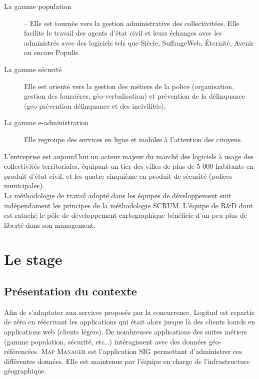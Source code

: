 \documentclass{rapportUHA40}
\begin{document}
\begin{description}
  \item[La gamme population] – Elle est tournée vers la gestion administrative des
    collectivitées. Elle facilite le travail des agents d'état civil et leurs
    échanges avec les administrés avec des logiciels tels que Siècle, SuffrageWeb,
    Éternité, Avenir ou encore Populis.
  \item[La gamme sécurité] Elle est orienté vers la gestion des métiers de la police
    (organisation, gestion des fourrières, géo-verbalisation) et prévention de la
    délinquance (geo-prévention délinquance et des incivilités).
  \item[La gamme e-administration] Elle regroupe des services en ligne et mobiles à
    l'attention des citoyens.
\end{description}


L'entreprise est aujourd’hui un acteur majeur du marché des logiciels à usage
des collectivités territoriales, équipant un tier des villes de plus de 5 000
habitants en produit d’état-civil, et les quatre cinquième en produit de
sécurité (polices municipales).\\

La méthodologie de travail adopté dans les équipes de développement suit
indépendament les principes de la méthodologie SCRUM\@. L'équipe de R\&D dont
est rataché le pôle de développement cartographique bénéficie d'un peu plus de
liberté dans son management.

\newpage
\section{Le stage}
\subsection{Présentation du contexte}

Afin de s'adaptater aux services proposés par la concurrence, Logitud est
repartie de zéro en réécrivant les applications qui était alors jusque là des
clients lourds en applications web (clients légers). De nombreuses applications
des suites métiers (gamme population, sécurité, etc\ldots) intéragissent avec
des données géo-référencées. \textsc{Map Manager} est l'application SIG
permettant d’administrer ces différentes données. Elle est maintenue par
l’équipe en charge de l’infrastructure géographique.
\end{document}
